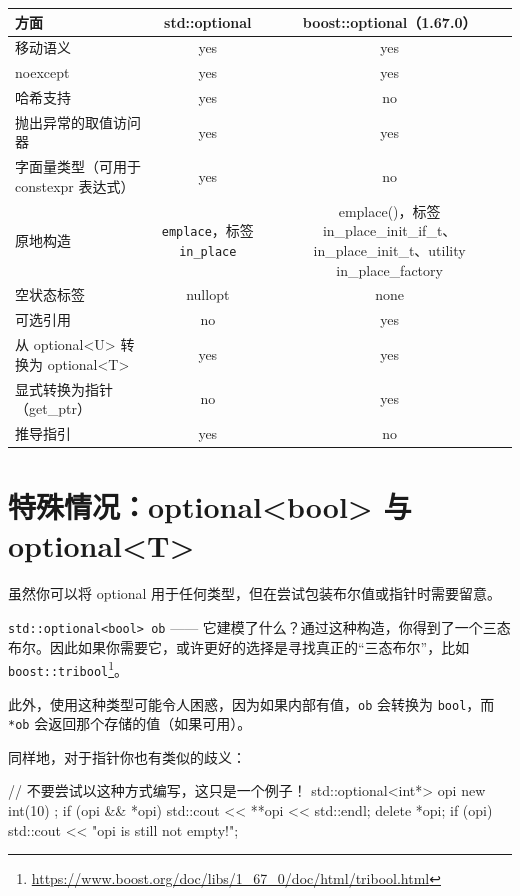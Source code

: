 \begin{table}[H]
\centering
\begin{tabularx}{\textwidth}{X c c}
\toprule
方面 & std::optional & boost::optional（1.67.0\footnotemark） \\
\midrule
移动语义 & yes & yes \\
noexcept & yes & yes \\
哈希支持 & yes & no \\
抛出异常的取值访问器 & yes & yes \\
字面量类型（可用于 constexpr 表达式） & yes & no \\
原地构造 & \texttt{emplace}，标签 \texttt{in\_place} & emplace()，标签 in\_place\_init\_if\_t、in\_place\_init\_t、utility in\_place\_factory \\
空状态标签 & nullopt & none \\
可选引用 & no & yes \\
从 optional<U> 转换为 optional<T> & yes & yes \\
显式转换为指针（get\_ptr） & no & yes \\
推导指引 & yes & no \\
\bottomrule
\end{tabularx}
\end{table}

\section{特殊情况：optional<bool> 与 optional<T\*>}
虽然你可以将 optional 用于任何类型，但在尝试包装布尔值或指针时需要留意。

\texttt{std::optional<bool> ob} —— 它建模了什么？通过这种构造，你得到了一个三态布尔。因此如果你需要它，或许更好的选择是寻找真正的“三态布尔”，比如 \texttt{boost::tribool}\footnote{\url{https://www.boost.org/doc/libs/1_67_0/doc/html/tribool.html}}。

此外，使用这种类型可能令人困惑，因为如果内部有值，\texttt{ob} 会转换为 \texttt{bool}，而 \texttt{*ob} 会返回那个存储的值（如果可用）。

同样地，对于指针你也有类似的歧义：

\begin{codebox}[cpp]
// 不要尝试以这种方式编写，这只是一个例子！
std::optional<int*> opi { new int(10) };
if (opi && *opi)
{
std::cout << **opi << std::endl;
delete *opi;
}
if (opi)
std::cout << "opi is still not empty!";
\end{codebox}

